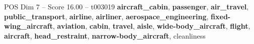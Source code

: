 \begin{textsample}{POS Dim 7 – Score 16.00 – t003019}  \label{ex:f7_pos_028}
\textbf{aircraft\_cabin}, \textbf{passenger}, \textbf{air\_travel}, \textbf{public\_transport}, \textbf{airline}, \textbf{airliner}, \textbf{aerospace\_engineering}, \textbf{fixed-wing\_aircraft}, \textbf{aviation}, \textbf{cabin}, \textbf{travel}, \textbf{aisle}, \textbf{wide-body\_aircraft}, \textbf{flight}, \textbf{aircraft}, \textbf{head\_restraint}, \textbf{narrow-body\_aircraft}, cleanliness

\end{textsample}
